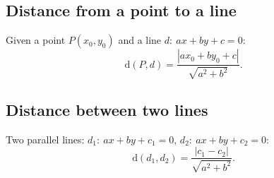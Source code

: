 \subsection*{Distance from a point to a line}
Given a point $P(x_0,y_0)$ and a line $d:\ ax+by+c=0$:
\[
\mathrm{d}(P,d)=\frac{|a x_0+b y_0+c|}{\sqrt{a^2+b^2}}.
\]

\subsection*{Distance between two lines}
Two parallel lines: $d_1:\ ax+by+c_1=0$, $d_2:\ ax+by+c_2=0$:
\[
\mathrm{d}(d_1,d_2)=\frac{|c_1-c_2|}{\sqrt{a^2+b^2}}.
\]
